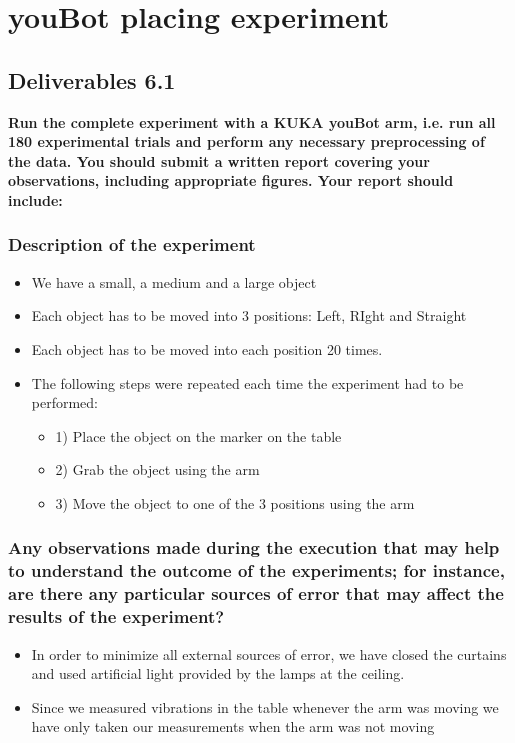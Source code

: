 \chapter{youBot placing experiment}
\section{Deliverables 6.1}
\textbf{Run the complete experiment with a KUKA youBot arm, i.e. run all 180 experimental trials and perform any necessary preprocessing of the data. You should submit a written report covering your observations, including appropriate figures. Your report should include:}

\subsection{Description of the experiment}

\begin{itemize}
	\item We have a small, a medium and a large object
	\item Each object has to be moved into 3 positions: Left, RIght and Straight
	\item Each object has to be moved into each position 20 times.
	\item The following steps were repeated each time the experiment had to be performed:
	\begin{itemize}
		\item 1) Place the object on the marker on the table
		\item 2) Grab the object using the arm
		\item 3) Move the object to one of the 3 positions using the arm
	\end{itemize}
\end{itemize}


\subsection{Any observations made during the execution that may help to understand the outcome of the experiments; for instance, are there any particular sources of error that may affect the results of the experiment?}

\begin{itemize}
	\item In order to minimize all external sources of error, we have closed the curtains and used artificial light provided by the lamps at the ceiling.
	\item Since we measured vibrations in the table whenever the arm was moving we have only taken our measurements when the arm was not moving
\end{itemize}






